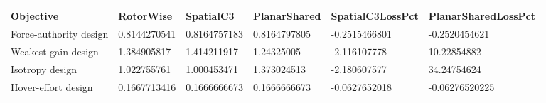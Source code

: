 \begin{tabular}{@{}llllll@{}}
\toprule
Objective & RotorWise & SpatialC3 & PlanarShared & SpatialC3LossPct & PlanarSharedLossPct \\
\midrule
Force-authority design & 0.8144270541 & 0.8164757183 & 0.8164797805 & -0.2515466801 & -0.2520454621 \\
Weakest-gain design & 1.384905817 & 1.414211917 & 1.24325005 & -2.116107778 & 10.22854882 \\
Isotropy design & 1.022755761 & 1.000453471 & 1.373024513 & -2.180607577 & 34.24754624 \\
Hover-effort design & 0.1667713416 & 0.1666666673 & 0.1666666673 & -0.0627652018 & -0.06276520225 \\
\bottomrule
\end{tabular}
